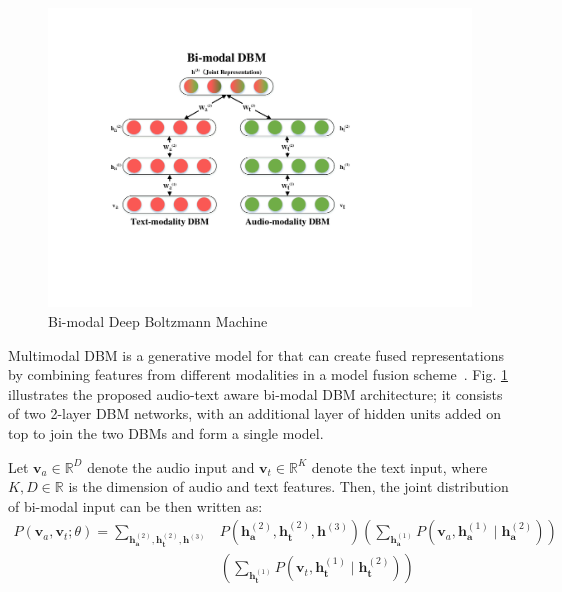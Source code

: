 \documentclass{llncs}
\begin{document}

\begin{figure}
	\centering
	\includegraphics[width=0.5\columnwidth]{figures/bi-modalDBM}
	\caption{Bi-modal Deep Boltzmann Machine}
	\label{fg:DBM}
\end{figure}

Multimodal DBM is a generative model for that can create fused representations by combining features from different modalities in a model fusion scheme~\cite{DBLP:journals/jmlr/SrivastavaS14}. %
Fig. \ref{fg:DBM} illustrates the proposed audio-text aware bi-modal DBM architecture; it consists of two 2-layer DBM networks, with an additional layer of hidden units added on top to join the two DBMs and form a single model. 

Let $\mathbf{v}_{a}\in\mathbb{R}^{D}$ denote the audio input and $\mathbf{v}_{t}\in\mathbb{R}^{K}$ denote the text input, where $K,D\in\mathbb{R}$ is the dimension of audio and text features. Then, the joint distribution of bi-modal input can be then written as:
\begin{equation}\label{eq3}
\begin{split}
P(\mathbf{v}_{a},\mathbf{v}_{t};\theta)=\sum_{\mathbf{h}_{\mathbf{a}}^{(2)},\mathbf{h}_{\mathbf{t}}^{(2)},\mathbf{h}^{(3)}} &P(\mathbf{h}_{\mathbf{a}}^{(2)},\mathbf{h}_{\mathbf{t}}^{(2)},\mathbf{h}^{(3)})\left(\sum_{\mathbf{h}_{\mathbf{a}}^{(1)}}P(\mathbf{v}_{a},\mathbf{h}_{\mathbf{a}}^{(1)}\mid \mathbf{h}_{\mathbf{a}}^{(2)})\right) \\
& \left(\sum_{\mathbf{h}_{\mathbf{t}}^{(1)}}P(\mathbf{v}_{t},\mathbf{h}_{\mathbf{t}}^{(1)}\mid \mathbf{h}_{\mathbf{t}}^{(2)})\right)
\end{split}
\end{equation}
\end{document}
